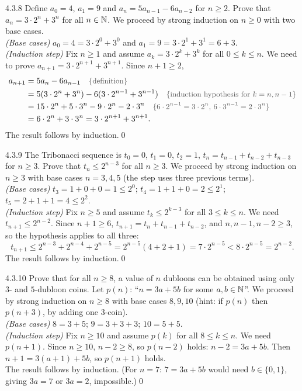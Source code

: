 \begin{bookex}[essential]{4.3.8}
Define $a_0=4$, $a_1=9$ and $a_n=5a_{n-1}-6a_{n-2}$ for $n\ge2$. Prove that $a_n=3\cdot2^n+3^n$ for all $n\in\mathbb{N}$.
\solution
We proceed by strong induction on $n\ge0$ with two base cases.\\
\emph{(Base cases)} $a_0=4=3\cdot2^0+3^0$ and $a_1=9=3\cdot2^1+3^1=6+3$.\\
\emph{(Induction step)} Fix $n\ge1$ and assume $a_k=3\cdot2^k+3^k$ for all $0\le k\le n$. We need to prove $a_{n+1}=3\cdot2^{n+1}+3^{n+1}$. Since $n+1\ge2$,
\begin{align*}
a_{n+1}&=5a_n-6a_{n-1}\reason{definition}\\
&=5(3\cdot2^n+3^n)-6(3\cdot2^{n-1}+3^{n-1})\reason{induction hypothesis for $k=n,n-1$}\\
&=15\cdot2^n+5\cdot3^n-9\cdot2^n-2\cdot3^n\reason{$6\cdot2^{n-1}=3\cdot2^n$, $6\cdot3^{n-1}=2\cdot3^n$}\\
&=6\cdot2^n+3\cdot3^n=3\cdot2^{n+1}+3^{n+1}.
\end{align*}
The result follows by induction.\qed
\end{bookex}

\begin{bookex}[essential]{4.3.9}
The Tribonacci sequence is $t_0=0$, $t_1=0$, $t_2=1$, $t_n=t_{n-1}+t_{n-2}+t_{n-3}$ for $n\ge3$. Prove that $t_n\le2^{n-3}$ for all $n\ge3$.
\solution
We proceed by strong induction on $n\ge3$ with base cases $n=3,4,5$ (the step uses three previous terms).\\
\emph{(Base cases)} $t_3=1+0+0=1\le2^0$; $t_4=1+1+0=2\le2^1$; $t_5=2+1+1=4\le2^2$.\\
\emph{(Induction step)} Fix $n\ge5$ and assume $t_k\le2^{k-3}$ for all $3\le k\le n$. We need $t_{n+1}\le2^{n-2}$. Since $n+1\ge6$, $t_{n+1}=t_n+t_{n-1}+t_{n-2}$, and $n,n-1,n-2\ge3$, so the hypothesis applies to all three:
\[
t_{n+1}\le2^{n-3}+2^{n-4}+2^{n-5}=2^{n-5}(4+2+1)=7\cdot2^{n-5}<8\cdot2^{n-5}=2^{n-2}.
\]
The result follows by induction.\qed
\end{bookex}

\begin{bookex}[recommended]{4.3.10}
Prove that for all $n\ge8$, a value of $n$ dubloons can be obtained using only $3$- and $5$-dubloon coins.
\solution
Let $p(n)$: ``$n=3a+5b$ for some $a,b\in\mathbb{N}$''. We proceed by strong induction on $n\ge8$ with base cases $8,9,10$ (hint: if $p(n)$ then $p(n+3)$, by adding one $3$-coin).\\
\emph{(Base cases)} $8=3+5$; $9=3+3+3$; $10=5+5$.\\
\emph{(Induction step)} Fix $n\ge10$ and assume $p(k)$ for all $8\le k\le n$. We need $p(n+1)$. Since $n\ge10$, $n-2\ge8$, so $p(n-2)$ holds: $n-2=3a+5b$. Then $n+1=3(a+1)+5b$, so $p(n+1)$ holds.\\
The result follows by induction. (For $n=7$: $7=3a+5b$ would need $b\in\{0,1\}$, giving $3a=7$ or $3a=2$, impossible.)\qed
\end{bookex}


